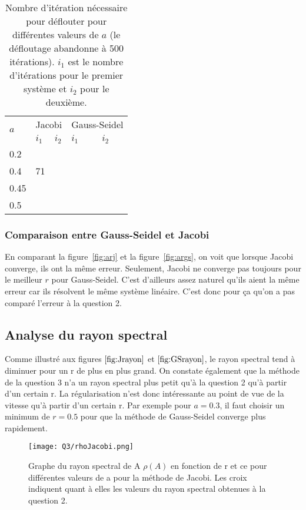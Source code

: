 \begin{table}
  \centering
  \begin{tabular}{|l|l|l|l|l|}
    \hline
    \multirow{2}{*}{$a$} & \multicolumn{2}{l|}{Jacobi} & \multicolumn{2}{l|}{Gauss-Seidel}\\
    \cline{2-5}
        & $i_1$ & $i_2$ & $i_1$ & $i_2$\\
    \hline
    0.2 &     &     &     & \\
    \hline
    0.4 & 71    &     &     & \\
    \hline
    0.45&   &    &     & \\
    \hline
    0.5 &    &   &    & \\
    \hline
  \end{tabular}
  \caption{Nombre d'itération nécessaire pour déflouter pour différentes valeurs de $a$ (le défloutage abandonne à 500 itérations).
  $i_1$ est le nombre d'itérations pour le premier système et $i_2$ pour le deuxième.}
  \label{tab:iter}
\end{table}

\subsubsection{Comparaison entre Gauss-Seidel et Jacobi}
En comparant la figure~\ref{fig:arj} et la figure~\ref{fig:args}, on voit
que lorsque Jacobi converge, ils ont la même erreur.
Seulement, Jacobi ne converge pas toujours pour le meilleur $r$ pour Gauss-Seidel.
C'est d'ailleurs assez naturel qu'ils aient la même erreur car ils résolvent le même
système linéaire.
C'est donc pour ça qu'on a pas comparé l'erreur à la question 2.

\subsection{Analyse du rayon spectral}

Comme illustré aux figures $\ref{fig:Jrayon}$ et $\ref{fig:GSrayon}$, le rayon spectral tend à diminuer pour un r de plus en plus grand. On constate également que la méthode de la question 3 n'a un rayon spectral plus petit qu'à la question 2 qu'à partir d'un certain r. La régularisation n'est donc intéressante au point de vue de la vitesse qu'à partir d'un certain r. Par exemple pour $a = 0.3$, il faut choisir un minimum de $r = 0.5$ pour que la méthode de Gauss-Seidel converge plus rapidement. 


\begin{figure} \label{fig:Jrayon}
  \centering
  \texttt{[image: Q3/rhoJacobi.png]}
  \caption{Graphe du rayon spectral de A $\rho(A)$ en fonction de r et ce pour différentes valeurs de a pour la méthode de Jacobi. Les croix indiquent quant à elles les valeurs du rayon spectral obtenues à la question 2.}
  \label{fig:ar}
\end{figure}

